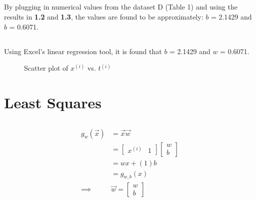 \documentclass{article}
\begin{document}
\subsection{}
By plugging in numerical values from the dataset D (Table 1) and using the results in \textbf{1.2} and \textbf{1.3}, the values are found to be approximately: $b$ = 2.1429 and $b$ = 0.6071.



\subsection{}
Using Excel's linear regression tool, it is found that $b$ = 2.1429 and $w$ = 0.6071.


\begin{figure}[ht]
  \centering
  \caption{Scatter plot of $x^{(i)}$ vs. $t^{(i)}$}
\end{figure}


\section{Least Squares}
\subsection{}
\begin{align*}
g_w(\vec{x}) &= \vec{x}\vec{w} \\
&= \begin{bmatrix} x^{(i)} & 1 \end{bmatrix} \begin{bmatrix} w \\ b \end{bmatrix} \\ %
&= wx + (1)b \\
&= g_{w, b} (x) \\
\implies & \boxed{	 \vec{w} = 	 \begin{bmatrix} w \\ b \end{bmatrix}	} 
\end{align*}
\end{document}
